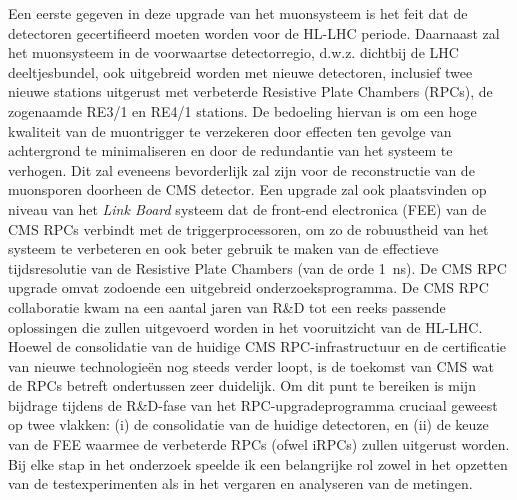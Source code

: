 	Een eerste gegeven in deze upgrade van het muonsysteem is het feit dat de detectoren gecertifieerd moeten worden voor de HL-LHC periode. Daarnaast zal het muonsysteem in de voorwaartse detectorregio, d.w.z. dichtbij de LHC deeltjesbundel, ook uitgebreid worden met nieuwe detectoren, inclusief twee nieuwe stations uitgerust met verbeterde Resistive Plate Chambers (RPCs), de zogenaamde RE3/1 en RE4/1 stations. De bedoeling hiervan is om een hoge kwaliteit van de muontrigger te verzekeren door effecten ten gevolge van achtergrond te minimaliseren en door de redundantie van het systeem te verhogen. Dit zal eveneens bevorderlijk zal zijn voor de reconstructie van de muonsporen doorheen de CMS detector. Een upgrade zal ook plaatsvinden op niveau van het {\it Link Board} systeem dat de front-end electronica (FEE) van de CMS RPCs verbindt met de triggerprocessoren, om zo de robuustheid van het systeem te verbeteren en ook beter gebruik te maken van de effectieve tijdsresolutie van de Resistive Plate Chambers (van de orde \SI{1}{ns}). De CMS RPC upgrade omvat zodoende een uitgebreid onderzoeksprogramma. De CMS RPC collaboratie kwam na een aantal jaren van R\&D tot een reeks passende oplossingen die zullen uitgevoerd worden in het vooruitzicht van de HL-LHC. Hoewel de consolidatie van de huidige CMS RPC-infrastructuur en de certificatie van nieuwe technologieën nog steeds verder loopt, is de toekomst van CMS wat de RPCs betreft ondertussen zeer duidelijk. Om dit punt te bereiken is mijn bijdrage tijdens de R\&D-fase van het RPC-upgradeprogramma cruciaal geweest op twee vlakken: (i) de consolidatie van de huidige detectoren, en (ii) de keuze van de FEE waarmee de verbeterde RPCs (ofwel iRPCs) zullen uitgerust worden. Bij elke stap in het onderzoek speelde ik een belangrijke rol zowel in het opzetten van de testexperimenten als in het vergaren en analyseren van de metingen.\\

